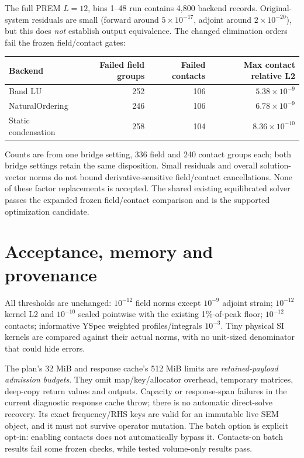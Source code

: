 The full PREM $L=12$, bins 1--48 run contains 4,800 backend records. Original-system residuals are small (forward around $5\times10^{-17}$, adjoint around $2\times10^{-20}$), but this does \emph{not} establish output equivalence. The changed elimination orders fail the frozen field/contact gates:
\begin{center}
\begin{tabular}{lrrr}
\toprule
Backend & Failed field groups & Failed contacts & Max contact relative L2\\
\midrule
Band LU & 252 & 106 & $5.38\times10^{-9}$\\
NaturalOrdering & 246 & 106 & $6.78\times10^{-9}$\\
Static condensation & 258 & 104 & $8.36\times10^{-10}$\\
\bottomrule
\end{tabular}
\end{center}
Counts are from one bridge setting, 336 field and 240 contact groups each; both bridge settings retain the same disposition. Small residuals and overall solution-vector norms do not bound derivative-sensitive field/contact cancellations. None of these factor replacements is accepted. The shared existing equilibrated solver passes the expanded frozen field/contact comparison and is the supported optimization candidate.

\section{Acceptance, memory and provenance}
\ValidationText

All thresholds are unchanged: $10^{-12}$ field norms except $10^{-9}$ adjoint strain; $10^{-12}$ kernel L2 and $10^{-10}$ scaled pointwise with the existing 1\%-of-peak floor; $10^{-12}$ contacts; informative YSpec weighted profiles/integrals $10^{-3}$. Tiny physical SI kernels are compared against their actual norms, with no unit-sized denominator that could hide errors.

The plan's 32 MiB and response cache's 512 MiB limits are \emph{retained-payload admission budgets}. They omit map/key/allocator overhead, temporary matrices, deep-copy return values and outputs. Capacity or response-span failures in the current diagnostic response cache throw; there is no automatic direct-solve recovery. Its exact frequency/RHS keys are valid for an immutable live SEM object, and it must not survive operator mutation. The batch option is explicit opt-in: enabling contacts does not automatically bypass it. Contacts-on batch results fail some frozen checks, while tested volume-only results pass.

